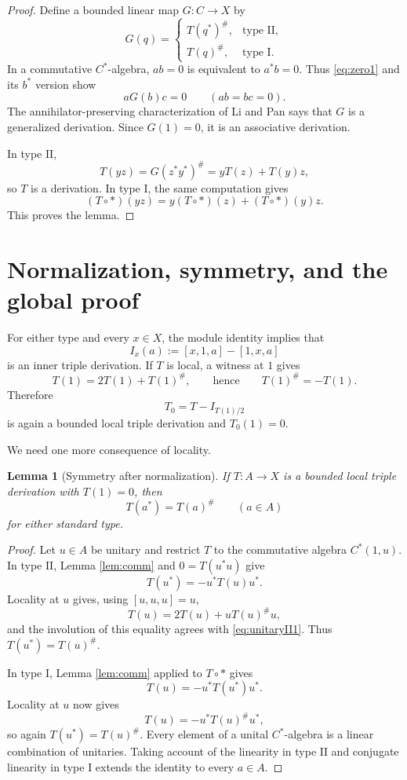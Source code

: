 \documentclass[11pt]{article}
\newtheorem{lemma}[theorem]{Lemma}
\newcommand{\I}{\mathrm I}
\newcommand{\II}{\mathrm{II}}
\begin{document}
\begin{proof}
Define a bounded linear map $G:C\to X$ by
\[
 G(q)=
 \begin{cases}
 T(q^*)^\#,&\text{type }\II,\\
 T(q)^\#,&\text{type }\I.
 \end{cases}
\]
In a commutative $C^*$-algebra, $ab=0$ is equivalent to $a^*b=0$.
Thus \eqref{eq:zero1} and its $b^*$ version show
\[
 aG(b)c=0\qquad(ab=bc=0).
\]
The annihilator-preserving characterization of Li and Pan
\cite[Corollary 2.9]{LP} says that $G$ is a generalized derivation.  Since
$G(1)=0$, it is an associative derivation.

In type $\II$,
\[
 T(yz)=G(z^*y^*)^\#=yT(z)+T(y)z,
\]
so $T$ is a derivation.  In type $\I$, the same computation gives
\[
 (T\circ *)(yz)=y(T\circ *)(z)+(T\circ *)(y)z.
\]
This proves the lemma.
\end{proof}

\section{Normalization, symmetry, and the global proof}

For either type and every $x\in X$, the module identity implies that
\[
 I_x(a):=[x,1,a]-[1,x,a]
\]
is an inner triple derivation.  If $T$ is local, a witness at $1$ gives
\[
 T(1)=2T(1)+T(1)^\#,
 \qquad\text{hence}\qquad T(1)^\#=-T(1).
\]
Therefore
\begin{equation}
 T_0=T-I_{T(1)/2} \label{eq:normalize}
\end{equation}
is again a bounded local triple derivation and $T_0(1)=0$.

We need one more consequence of locality.

\begin{lemma}[Symmetry after normalization]
\label{lem:symmetry}
If $T:A\to X$ is a bounded local triple derivation with $T(1)=0$, then
\[
 T(a^*)=T(a)^\#\qquad(a\in A)
\]
for either standard type.
\end{lemma}

\begin{proof}
Let $u\in A$ be unitary and restrict $T$ to the commutative algebra
$C^*(1,u)$.  In type $\II$, Lemma \ref{lem:comm} and
$0=T(u^*u)$ give
\begin{equation}
 T(u^*)=-u^*T(u)u^*. \label{eq:unitaryII1}
\end{equation}
Locality at $u$ gives, using $[u,u,u]=u$,
\[
 T(u)=2T(u)+uT(u)^\#u,
\]
and the involution of this equality agrees with
\eqref{eq:unitaryII1}.  Thus $T(u^*)=T(u)^\#$.

In type $\I$, Lemma \ref{lem:comm} applied to $T\circ *$ gives
\[
 T(u)=-u^*T(u^*)u^*.
\]
Locality at $u$ now gives
\[
 T(u)=-u^*T(u)^\#u^*,
\]
so again $T(u^*)=T(u)^\#$.  Every element of a unital
$C^*$-algebra is a linear combination of unitaries.  Taking account of the
linearity in type $\II$ and conjugate linearity in type $\I$ extends the
identity to every $a\in A$.
\end{proof}
\end{document}
